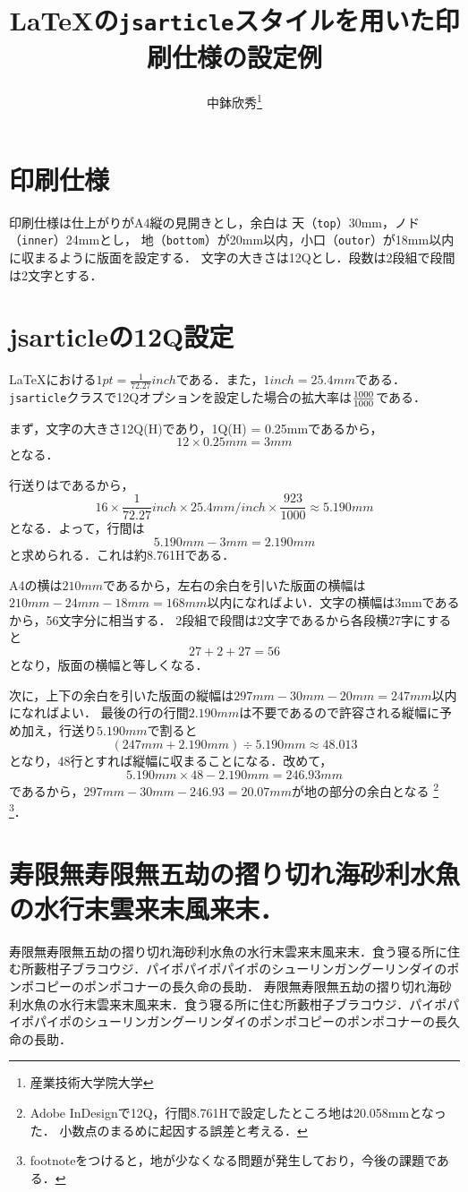 \documentclass[a4j, 12Q, twocolumn, twoside]{jsarticle}
\title{\LaTeX の\texttt{jsarticle}スタイルを用いた印刷仕様の設定例}
\author{中鉢欣秀\thanks{産業技術大学院大学}}
\begin{document}
\maketitle
\section{印刷仕様}

  印刷仕様は仕上がりがA4縦の見開きとし，余白は
  天（\texttt{top}）30mm，ノド（\texttt{inner}）24mmとし，
  地（\texttt{bottom}）が20mm以内，小口（\texttt{outor}）が18mm以内に収まるように版面を設定する．
  文字の大きさは12Qとし．段数は2段組で段間は2文字とする．

\section{jsarticleの12Q設定}
  \LaTeX における$1 pt = \frac{1}{72.27} inch$である．また，$1 inch = 25.4 mm$である．
  \texttt{jsarticle}クラスで12Qオプションを設定した場合の拡大率は$\frac{\the\mag}{1000}$である．

  まず，文字の大きさ12Q(H)であり，1Q(H) = 0.25mmであるから，
  \[ 12 \times 0.25 mm = 3 mm \]
  となる．

  行送りは\the\baselineskip であるから，
　　\[ 16 \times \frac{1}{72.27} inch \times 25.4 mm/inch \times \frac{923}{1000} \approx 5.190 mm \]
  となる．よって，行間は
  \[ 5.190 mm - 3 mm = 2.190 mm \]
  と求められる．これは約8.761Hである．
  
  A4の横は$210mm$であるから，左右の余白を引いた版面の横幅は
  $210mm - 24mm - 18mm = 168mm$以内になればよい．文字の横幅は3mmであるから，56文字分に相当する．
  2段組で段間は2文字であるから各段横27字にすると\[ 27 + 2 + 27 = 56 \]となり，版面の横幅と等しくなる．
  
  次に，上下の余白を引いた版面の縦幅は$297mm - 30mm - 20mm = 247mm$以内になればよい．
  最後の行の行間$2.190mm$は不要であるので許容される縦幅に予め加え，行送り$5.190mm$で割ると
  \[ (247mm + 2.190mm) \div 5.190mm \approx 48.013 \]
  となり，48行とすれば縦幅に収まることになる．改めて，
  \[ 5.190mm \times 48 - 2.190mm = 246.93mm \]
  であるから，$297mm -30mm - 246.93 = 20.07mm$が地の部分の余白となる
  \footnote{Adobe InDesignで12Q，行間8.761Hで設定したところ地は20.058mmとなった．
  小数点のまるめに起因する誤差と考える．}
  \footnote{footnoteをつけると，地が少なくなる問題が発生しており，今後の課題である．}． 
\section{寿限無寿限無五劫の摺り切れ海砂利水魚の水行末雲来末風来末．}
寿限無寿限無五劫の摺り切れ海砂利水魚の水行末雲来末風来末．食う寝る所に住む所藪柑子ブラコウジ．パイポパイポパイポのシューリンガングーリンダイのポンポコピーのポンポコナーの長久命の長助．
寿限無寿限無五劫の摺り切れ海砂利水魚の水行末雲来末風来末．食う寝る所に住む所藪柑子ブラコウジ．パイポパイポパイポのシューリンガングーリンダイのポンポコピーのポンポコナーの長久命の長助．
\end{document}
